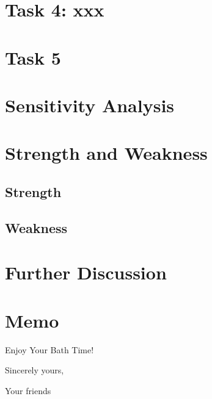\documentclass{mcmthesis}
\begin{document}
	
	\section{Task 4: xxx}
	
	\section{Task 5}
	
	\section{Sensitivity Analysis}
	
	\section{Strength and Weakness}
	\subsection{Strength}
	\subsection{Weakness}
	
	\section{Further Discussion}
	
	
	
	\newpage
	\section*{Memo} %
	
	\begin{letter}{Enjoy Your Bath Time!}
		
		
		\vspace{\parskip}
		
		Sincerely yours,
		
		Your friends
		
	\end{letter}
	
	
	
	
	
	
	
	
	
\end{document}
